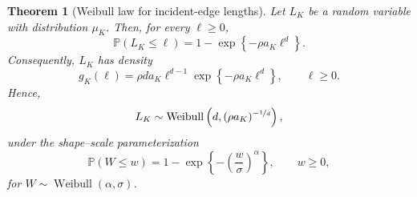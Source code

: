 \documentclass[a4paper,fleqn]{cas-dc}
\numberwithin{equation}{section}
\newcommand{\Pp}{\mathds{P}}
\newcommand{\1}{\mathds{1}}
\newcommand{\0}{\mathbf{0}}
\newtheorem{theorem}{Theorem}[section]
\begin{document}
\begin{theorem}[Weibull law for incident-edge lengths]
\label{thm:palm-edge-length-weibull}
Let \(L_K\) be a random variable with distribution \(\mu_K\). Then,
for every \(\ell\geq0\),
\begin{equation}
\label{eq:palm-edge-length-cdf}
\Pp(L_K\leq\ell)
=
1-\exp\left\{-\rho a_K\ell^d\right\}.
\end{equation}
Consequently, \(L_K\) has density
\begin{equation}
\label{eq:palm-edge-length-density}
g_K(\ell)
=
\rho d a_K\ell^{d-1}
\exp\left\{-\rho a_K\ell^d\right\},
\qquad
\ell\geq0.
\end{equation}
Hence,
\begin{equation}
\label{eq:palm-edge-length-weibull}
L_K
\sim
\operatorname{Weibull}
\left(
d,
(\rho a_K)^{-\nicefrac{1}{d}}
\right),
\end{equation}
under the shape--scale parameterization
\begin{equation}
\label{eq:weibull-shape-scale-convention}
\Pp(W\leq w)
=
1-
\exp\left\{
-\left(\frac{w}{\sigma}\right)^\alpha
\right\},
\qquad
w\geq0,
\end{equation}
for \(W\sim\operatorname{Weibull}(\alpha,\sigma)\).
\end{theorem}
\end{document}
